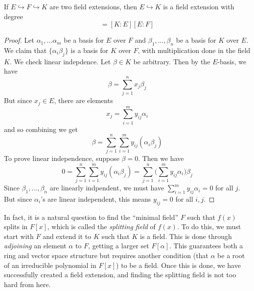   \begin{theorem}
    If $E \hookrightarrow F \hookrightarrow K$ are two field extensions, then $E \hookrightarrow K$ is a field extension with degree 
    \begin{equation}
      [K:E] = [K:E] [E:F]
    \end{equation}
  \end{theorem}
  \begin{proof}
    Let $\alpha_1, \ldots \alpha_m$ be a basis for $E$ over $F$ and $\beta_1, \ldots, \beta_n$ be a basis for $K$ over $E$. We claim that $\{\alpha_i \beta_j\}$ is a basis for $K$ over $F$, with multiplication done in the field $K$. We check linear indepdence. Let $\beta \in K$ be arbitrary. Then by the $E$-basis, we have 
    \begin{equation}
      \beta = \sum_{j=1}^n x_j \beta_j
    \end{equation} 
    But since $x_j \in E$, there are elements 
    \begin{equation}
      x_j = \sum_{i=1}^m y_{ij} \alpha_i
    \end{equation}
    and so combining we get 
    \begin{equation}
      \beta = \sum_{j=1}^n \sum_{i=1}^m y_{ij} (\alpha_i \beta_j) 
    \end{equation}
    To prove linear independence, suppose $\beta = 0$. Then we have 
    \begin{equation}
      0 = \sum_{j=1}^n \sum_{i=1}^m y_{ij} (\alpha_i \beta_j) = \sum_{j=1}^n \bigg( \sum_{i=1}^m y_{ij} \alpha_i \bigg) \beta_j 
    \end{equation}
    Since $\beta_1, \ldots, \beta_n$ are linearly indpendent, we must have $\sum_{i=1}^m y_{ij} \alpha_i = 0$ for all $j$. But since $\alpha_i$'s are linear independent, this means $y_{ij} = 0$ for all $i, j$. 
  \end{proof} 

  In fact, it is a natural question to find the ``minimal field'' $F$ such that $f(x)$ splits in $F[x]$, which is called the \textit{splitting field} of $f(x)$. To do this, we must start with $F$ and extend it to $K$ such that $K$ is a field. This is done through \textit{adjoining} an element $\alpha$ to $F$, getting a larger set $F[\alpha]$. This guarantees both a ring and vector space structure but requires another condition (that $\alpha$ be a root of an irreducible polynomial in $F[x]$) to be a field. Once this is done, we have successfully created a field extension, and finding the splitting field is not too hard from here. 

